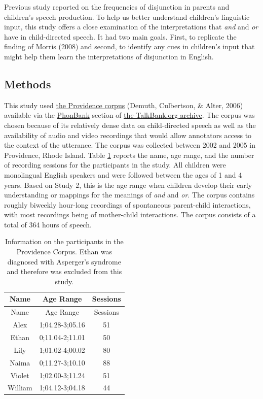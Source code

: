 \documentclass[floatsintext,man]{apa6}
\theoremstyle{definition}
\theoremstyle{definition}
\theoremstyle{definition}
\theoremstyle{remark}
\begin{document}
Previous study reported on the frequencies of disjunction in parents and
children's speech production. To help us better understand children's
linguistic input, this study offers a close examination of the
interpretations that \emph{and} and \emph{or} have in child-directed
speech. It had two main goals. First, to replicate the finding of Morris
(2008) and second, to identify any cues in children's input that might
help them learn the interpretations of disjunction in English.

\subsection{Methods}\label{methods-1}

This study used
\href{https://phonbank.talkbank.org/browser/index.php?url=Eng-NA/Providence/}{the
Providence corpus} (Demuth, Culbertson, \& Alter, 2006) available via
the \href{https://phonbank.talkbank.org}{PhonBank} section of
\href{https://talkbank.org/}{the TalkBank.org archive}. The corpus was
chosen because of its relatively dense data on child-directed speech as
well as the availability of audio and video recordings that would allow
annotators access to the context of the utterance. The corpus was
collected between 2002 and 2005 in Providence, Rhode Island. Table
\ref{tab:providence} reports the name, age range, and the number of
recording sessions for the participants in the study. All children were
monolingual English speakers and were followed between the ages of 1 and
4 years. Based on Study 2, this is the age range when children develop
their early understanding or mappings for the meanings of \emph{and} and
\emph{or}. The corpus contains roughly biweekly hour-long recordings of
spontaneous parent-child interactions, with most recordings being of
mother-child interactions. The corpus consists of a total of 364 hours
of speech.

\begin{longtable}[]{@{}ccc@{}}
\caption{\label{tab:providence} Information on the participants in the
Providence Corpus. Ethan was diagnosed with Asperger's syndrome and
therefore was excluded from this study.}\tabularnewline
\toprule
Name & Age Range & Sessions\tabularnewline
\midrule
\endfirsthead
\toprule
Name & Age Range & Sessions\tabularnewline
\midrule
\endhead
Alex & 1;04.28-3;05.16 & 51\tabularnewline
Ethan & 0;11.04-2;11.01 & 50\tabularnewline
Lily & 1;01.02-4;00.02 & 80\tabularnewline
Naima & 0;11.27-3;10.10 & 88\tabularnewline
Violet & 1;02.00-3;11.24 & 51\tabularnewline
William & 1;04.12-3;04.18 & 44\tabularnewline
\bottomrule
\end{longtable}
\end{document}
